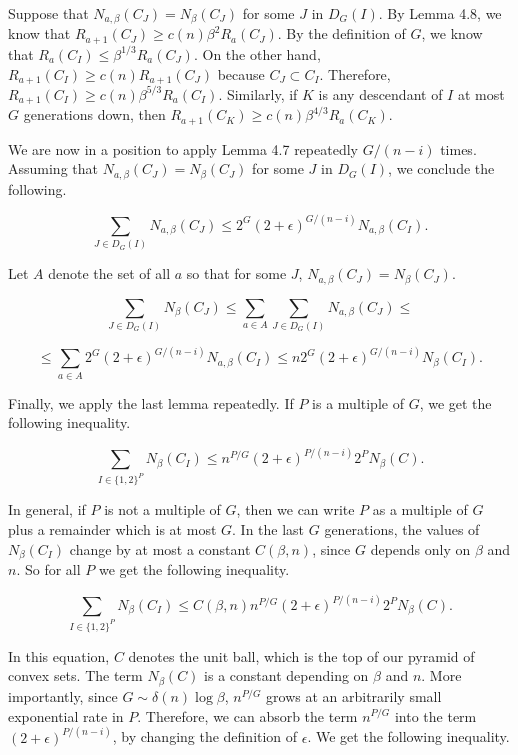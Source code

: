 \documentclass{amsart}
\newtheorem*{Theorem 1}{Theorem 1}
\newtheorem*{Theorem 2}{Theorem 2}
\newtheorem*{Theorem 1A}{Theorem 1A}
\newtheorem*{Theorem 2A}{Theorem 2A}
\newtheorem*{vanishing lemma}{Vanishing Lemma}
\numberwithin{equation}{section}
\begin{document}
\proof 

Suppose that $N_{a, \beta}(C_J) = N_\beta(C_J)$ for some $J$ in $D_G(I)$.  By
Lemma 4.8, we know that $R_{a+1}(C_J) \ge c(n) \beta^2 R_a(C_J)$.
By the definition of $G$, we know that $R_{a}(C_I) \le
\beta^{1/3} R_a(C_J)$.  On the other hand, $R_{a+1}(C_I) \ge c(n)
R_{a+1}(C_J)$ because $C_J \subset C_I$.  Therefore,
$R_{a+1}(C_I) \ge c(n) \beta^{5/3} R_a(C_I)$.  Similarly, if $K$
is any descendant of $I$ at most $G$ generations down, then
$R_{a+1}(C_K) \ge c(n) \beta^{4/3} R_a(C_K)$.

We are now in a position to apply Lemma 4.7 repeatedly $G/(n-i)$
times.  Assuming that $N_{a, \beta}(C_J) =N_\beta(C_J)$ for some $J$ in $D_G(I)$,
we conclude the following.

$$\sum_{J \in D_G(I)} N_{a, \beta}(C_J) \le 2^G (2+ \epsilon)^{G/(n-i)}
N_{a, \beta}(C_I).$$

Let $A$ denote the set of all $a$ so that for some $J$, $N_{a, \beta}(C_J) =
N_\beta(C_J)$.

$$\sum_{J \in D_G(I)} N_\beta(C_J) \le \sum_{a \in A} \sum_{J \in D_G(I)} N_{a, \beta}(C_J) \le$$

$$\le \sum_{a \in A} 2^G (2 + \epsilon)^{G/(n-i)} N_{a, \beta}(C_I) \le n 2^G (2 + \epsilon)^{G/(n-i)} N_\beta(C_I).$$

\endproof

Finally, we apply the last lemma repeatedly.  If $P$ is a multiple of $G$,
we get the following inequality.

$$\sum_{I \in \{1, 2 \}^P} N_\beta(C_I) \le n^{P/G} (2 +
\epsilon)^{P/(n-i)} 2^P N_\beta(C).$$

In general, if $P$ is not a multiple of $G$, then we can write $P$
as a multiple of $G$ plus a remainder which is at most $G$.  In the last
$G$ generations, the values of $N_\beta(C_I)$ change by at most a constant
$C(\beta, n)$, since $G$ depends only on $\beta$ and $n$.
So for all $P$ we get the following inequality.

$$\sum_{I \in \{1, 2\}^P} N_\beta(C_I) \le C(\beta, n) n^{P/G} (2 + \epsilon)^{P/(n-i)} 2^P N_\beta(C).$$

In this equation, $C$ denotes the unit ball, which is the top of
our pyramid of convex sets.  The term $N_\beta(C)$ is a constant
depending on $\beta$ and $n$.  More importantly, since $G \sim
\delta(n) \log \beta$, $n^{P/G}$ grows at an arbitrarily small
exponential rate in $P$.  Therefore, we can absorb the term
$n^{P/G}$ into the term $(2 + \epsilon)^{P/(n-i)}$, by
changing the definition of $\epsilon$.  We get the following
inequality.
\end{document}

